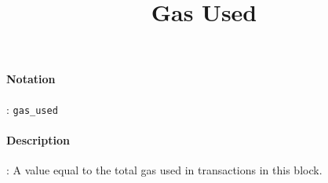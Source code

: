 \documentclass[10pt,a4paper,oneside]{scrartcl}
\author{}
\title{Gas Used}
\date{}
\begin{document}
\maketitle
\paragraph{Notation}: \texttt{gas\_used}
\paragraph{Description}: A value equal to the total gas used in transactions in this block. 
\end{document}
